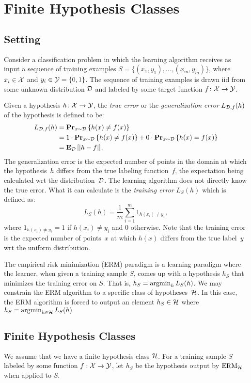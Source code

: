 \chapter{Finite Hypothesis Classes}

\section{Setting}

Consider a classification problem in which the learning algorithm receives as input
a sequence of training examples $S = \{(x_1, y_1), \ldots, (x_m, y_m)\}$,
where $x_i \in \mathcal{X}$ and $y_i \in \mathcal{Y} = \{0, 1\}$. The sequence of training
examples is drawn iid from some unknown distribution $\mathcal{D}$ and labeled by some
target function $f \colon \mathcal{X} \rightarrow \mathcal{Y}$.

Given a hypothesis $h \colon \mathcal{X} \rightarrow \mathcal{Y}$, the \emph{true error}
or the \emph{generalization error} $L_{\mathcal{D}, f}(h)$ of the hypothesis is defined to be:
\begin{align*}
    L_{\mathcal{D}, f}(h) & = \mathbf{Pr}_{x \sim \mathcal{D}} \left \{ h(x) \neq f(x) \right \} \\
                 & = 1 \cdot \mathbf{Pr}_{x \sim \mathcal{D}} \left \{ h(x) \neq f(x) \right \} +
                     0 \cdot \mathbf{Pr}_{x \sim \mathcal{D}} \left \{ h(x) = f(x) \right \} \\
                 & = \mathbf{E}_{\mathcal{D}} \left [ \lvert h - f \rvert \right ].
\end{align*}
The generalization error is the expected number of points in the domain at which
the hypothesis~$h$ differs from the true labeling function~$f$, the expectation being
calculated wrt the distribution~$\mathcal{D}$. The learning
algorithm does not directly know the true error. What it can calculate
is the \emph{training error} $L_{S}(h)$ which is defined as:
\[
    L_S (h) = \frac{1}{m} \sum_{i = 1}^{m} 1_{h(x_i) \neq y_i},
\]
where $1_{h(x_i) \neq y_i} =  1$ if $h(x_i) \neq y_i$ and $0$ otherwise. Note that
the training error is the expected number of points~$x$ at which $h(x)$ differs from
the true label~$y$ wrt the uniform distribution.

The empirical risk minimization (ERM) paradigm is a learning paradigm where the learner,
when given a training sample $S$, comes up with a hypothesis $h_S$ that minimizes
the training error on $S$. That is, $h_S = \operatorname{argmin}_{h} L_S(h)$. We may
constrain the ERM algorithm to a specific class of hypotheses~$\mathcal{H}$. In this
case, the ERM algorithm is forced to output an element $h_S \in \mathcal{H}$ where
$h_S = \operatorname{argmin}_{h \in \mathcal{H}} L_S(h)$


\section{Finite Hypothesis Classes}

We assume that we have a finite hypothesis class $\mathcal{H}$. For a training
sample $S$ labeled by some function $f: \mathcal{X} \rightarrow \mathcal{Y}$, let $h_S$
be the hypothesis output by $\text{ERM}_{\mathcal{H}}$ when applied to $S$.

